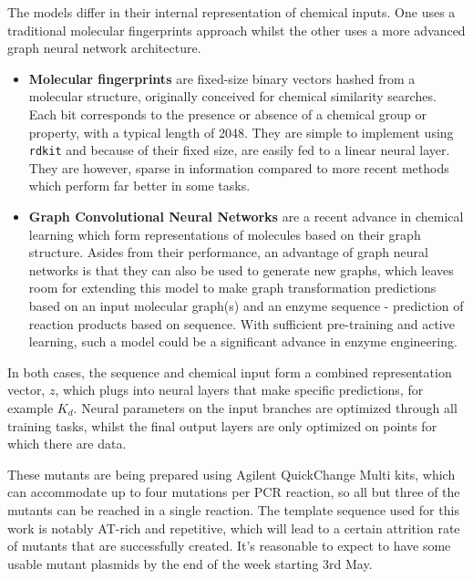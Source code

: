 \documentclass{article}
\begin{document}
\par 
The models differ in their internal representation of chemical inputs. One uses a traditional molecular fingerprints approach whilst the other uses a more advanced graph neural network architecture.
\par
\begin{itemize}
	\item \textbf{Molecular fingerprints} are fixed-size binary vectors hashed from a molecular structure, originally conceived for chemical similarity searches. Each bit corresponds to the presence or absence of a chemical group or property, with a typical length of 2048. They are simple to implement using \texttt{rdkit} and because of their fixed size, are easily fed to a linear neural layer. They are however, sparse in information compared to more recent methods which perform far better in some tasks. %
	\item \textbf{Graph Convolutional Neural Networks} are a recent advance in chemical learning which form representations of molecules based on their graph structure.  %
		Asides from their performance, an advantage of graph neural networks is that they can also be used to generate new graphs, which leaves room for extending this model to make graph transformation predictions based on an input molecular graph(s) and an enzyme sequence - prediction of reaction products based on sequence. With sufficient pre-training and active learning, such a model could be a significant advance in enzyme engineering.
\end{itemize}
\par 
In both cases, the sequence and chemical input form a combined representation vector, $z$, which plugs into neural layers that make specific predictions, for example $K_d$. Neural parameters on the input branches are optimized through all training tasks, whilst the final output layers are only optimized on points for which there are data. %
\par
These mutants are being prepared using Agilent QuickChange Multi kits, which can accommodate up to four mutations per PCR reaction, so all but three of the mutants can be reached in a single reaction. The template sequence used for this work is notably AT-rich and repetitive, which will lead to a certain attrition rate of mutants that are successfully created. It's reasonable to expect to have some usable mutant plasmids by the end of the week starting 3rd May. %
\par
\end{document}
